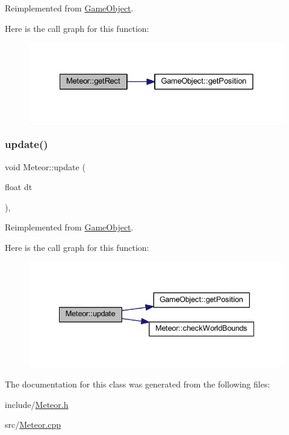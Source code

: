 Reimplemented from \hyperlink{class_game_object_aecc23e1558ae04e10083deae74774bd2}{Game\+Object}.

Here is the call graph for this function\+:
\nopagebreak
\begin{figure}[H]
\begin{center}
\leavevmode
\includegraphics[width=328pt]{class_meteor_a7db7163153835475758d65e983086120_cgraph}
\end{center}
\end{figure}
\mbox{\label{class_meteor_a141f6128d03a106bad61db3778404be7}} 
\subsubsection{\texorpdfstring{update()}{update()}}
{\footnotesize\ttfamily void Meteor\+::update (\begin{DoxyParamCaption}\item[{float}]{dt }\end{DoxyParamCaption})\hspace{0.3cm}{\ttfamily [override]}, {\ttfamily [virtual]}}



Reimplemented from \hyperlink{class_game_object_a2fece397b6343682d639f8943f124d0e}{Game\+Object}.

Here is the call graph for this function\+:
\nopagebreak
\begin{figure}[H]
\begin{center}
\leavevmode
\includegraphics[width=335pt]{class_meteor_a141f6128d03a106bad61db3778404be7_cgraph}
\end{center}
\end{figure}


The documentation for this class was generated from the following files\+:\begin{DoxyCompactItemize}
\item 
include/\hyperlink{_meteor_8h}{Meteor.\+h}\item 
src/\hyperlink{_meteor_8cpp}{Meteor.\+cpp}\end{DoxyCompactItemize}
